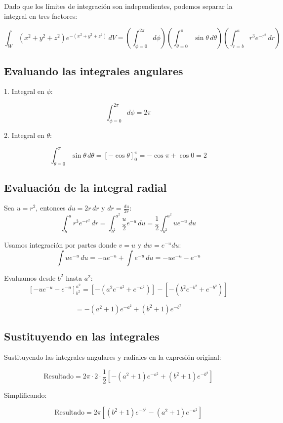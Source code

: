 Dado que los límites de integración son independientes, podemos separar la integral en tres factores:

\[
\int_W (x^2 + y^2 + z^2) e^{-(x^2 + y^2 + z^2)} \, dV = \left( \int_{\phi=0}^{2\pi} d\phi \right) \left( \int_{\theta=0}^{\pi} \sin\theta \, d\theta \right) \left( \int_{r=b}^{a} r^3 e^{-r^2} \, dr \right)
\]

\subsection*{Evaluando las integrales angulares}

1. Integral en \( \phi \):

\[
\int_{\phi=0}^{2\pi} d\phi = 2\pi
\]

2. Integral en \( \theta \):

\[
\int_{\theta=0}^{\pi} \sin\theta \, d\theta = \left[ -\cos\theta \right]_0^{\pi} = -\cos\pi + \cos0 = 2
\]

\subsection*{Evaluación de la integral radial}

Sea \( u = r^2 \), entonces \( du = 2r \, dr \) y \( dr = \frac{du}{2r} \):
\[
\int_{b}^{a} r^3 e^{-r^2} \, dr = \int_{b^2}^{a^2} \frac{u}{2} e^{-u} \, du = \frac{1}{2} \int_{b^2}^{a^2} u e^{-u} \, du
\]

Usamos integración por partes donde \( v = u \) y \( dw = e^{-u} du \):
\[
\int u e^{-u} \, du = -u e^{-u} + \int e^{-u} \, du = -u e^{-u} - e^{-u}
\]

Evaluamos desde \( b^2 \) hasta \( a^2 \):
\[
\left[ -u e^{-u} - e^{-u} \right]_{b^2}^{a^2} = \left[ -(a^2 e^{-a^2} + e^{-a^2}) \right] - \left[ -(b^2 e^{-b^2} + e^{-b^2}) \right]
\]

\[
= -(a^2 + 1)e^{-a^2} + (b^2 + 1)e^{-b^2}
\]

\subsection*{Sustituyendo en las integrales}

Sustituyendo las integrales angulares y radiales en la expresión original:

\[
\text{Resultado} = 2\pi \cdot 2 \cdot \frac{1}{2} \left[ -(a^2 + 1)e^{-a^2} + (b^2 + 1)e^{-b^2} \right]
\]

Simplificando:

\[
\text{Resultado} = 2\pi \left[ (b^2 + 1)e^{-b^2} - (a^2 + 1)e^{-a^2} \right]
\]

